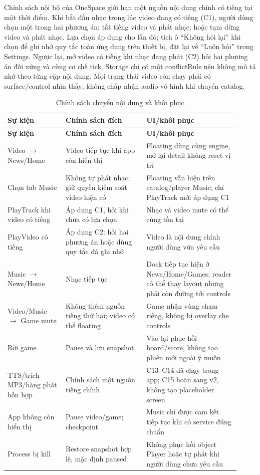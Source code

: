 Chính sách nội bộ của OneSpace giới hạn một nguồn nội dung chính có tiếng tại một thời điểm. Khi bắt đầu nhạc trong lúc video đang có tiếng (C1), người dùng chọn một trong hai phương án: tắt tiếng video và phát nhạc; hoặc tạm dừng video và phát nhạc. Lựa chọn áp dụng cho lần đó; tích ô ``Không hỏi lại'' khi chọn để ghi nhớ quy tắc toàn ứng dụng trên thiết bị, đặt lại về ``Luôn hỏi'' trong Settings. Ngược lại, mở video có tiếng khi nhạc đang phát (C2) hỏi hai phương án đối xứng và cùng cơ chế tick. Storage chỉ có một conflictRule nên không mô tả nhớ theo từng cặp nội dung. Mọi trạng thái video còn chạy phải có surface/control nhìn thấy; không chấp nhận audio vô hình khi chuyển catalog.

\begingroup
\small
\renewcommand{\arraystretch}{1.2}
\setlength{\tabcolsep}{3pt}
\begin{longtable}{>{\RaggedRight\arraybackslash}p{0.23\linewidth}>{\RaggedRight\arraybackslash}p{0.32\linewidth}>{\RaggedRight\arraybackslash}p{0.37\linewidth}}
\caption{Chính sách chuyển nội dung và khôi phục}
\label{tab:multitasking-matrix}\\
\toprule
\textbf{Sự kiện} & \textbf{Chính sách đích} & \textbf{UI/khôi phục} \\
\midrule
\endfirsthead
\toprule
\textbf{Sự kiện} & \textbf{Chính sách đích} & \textbf{UI/khôi phục} \\
\midrule
\endhead
\bottomrule
\endfoot
Video \(\rightarrow\) News/Home & Video tiếp tục khi app còn hiển thị & Floating dùng cùng engine, mở lại detail không reset vị trí \\
Chọn tab Music & Không tự phát nhạc; giữ quyền kiểm soát video hiện có & Floating vẫn hiện trên catalog/player Music; chỉ PlayTrack mới áp dụng C1 \\
PlayTrack khi video có tiếng & Áp dụng C1, hỏi khi chưa có lựa chọn & Nhạc và video mute có thể cùng tồn tại \\
PlayVideo có tiếng & Áp dụng C2: hỏi hai phương án hoặc dùng quy tắc đã ghi nhớ & Video là nội dung chính người dùng vừa yêu cầu \\
Music \(\rightarrow\) News/Home & Nhạc tiếp tục & Dock tiếp tục hiện ở News/Home/Games; reader có thể thay layout nhưng phải còn đường tới controls \\
Video/Music \(\rightarrow\) Game mute & Không thêm nguồn tiếng thứ hai; video có thể floating & Game nhận vùng chạm riêng, không bị overlay che controls \\
Rời game & Pause và lưu snapshot & Vào lại phục hồi board/score, không tạo phiên mới ngoài ý muốn \\
TTS/trích MP3/hàng phát hỗn hợp & Chính sách một nguồn tiếng chính & C13--C14 đã chạy trong app; C15 hoãn sang v2, không tạo placeholder screen \\
App không còn hiển thị & Pause video/game; checkpoint & Music chỉ được cam kết tiếp tục khi có service đúng chuẩn \\
Process bị kill & Restore snapshot hợp lệ, mặc định paused & Không phục hồi object Player hoặc tự phát khi người dùng chưa yêu cầu \\
\end{longtable}
\endgroup

